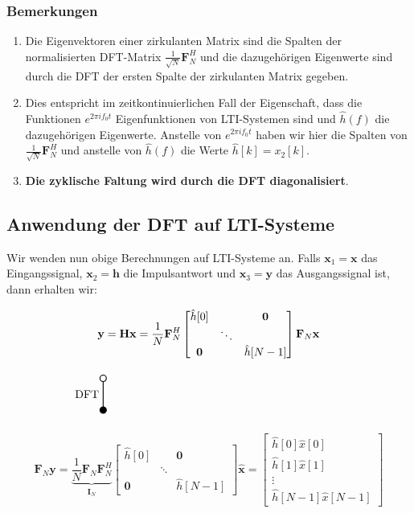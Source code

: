 \documentclass[11pt]{article}
\newcommand{\verticaltransform}[4]{%
    \begin{tikzpicture}
        \filldraw[thick] (0,0) circle (0.1) node[below=3pt] {$#4$};
        \draw[thick] (0,0.1) -- (0,#2 -0.1) node[midway, left] {#1};
        \draw[thick] (0,#2) circle (0.1) node[above=3pt] {$#3$};
    \end{tikzpicture}%
}
\begin{document}
\subsubsection*{Bemerkungen}

\begin{enumerate}
    \item Die Eigenvektoren einer zirkulanten Matrix sind die Spalten der normalisierten DFT-Matrix $\frac{1}{\sqrt{N}}\mathbf{F}_N^H$ und die dazugehörigen Eigenwerte sind durch die DFT der ersten Spalte der zirkulanten Matrix gegeben. 
    \item Dies entspricht im zeitkontinuierlichen Fall der Eigenschaft, dass die
    Funktionen $e^{2 \pi i f_0 t}$ Eigenfunktionen von LTI-Systemen sind und $\hat{h}(f)$ die dazugehörigen Eigenwerte. Anstelle von $e^{2 \pi i f_0 t}$ haben wir hier die Spalten von $\frac{1}{\sqrt{N}}\mathbf{F}_N^H$ und anstelle von $\hat{h}(f)$ die Werte $\hat{h}[k] = x_2[k]$.
    \item \textbf{Die zyklische Faltung wird durch die DFT diagonalisiert}.
\end{enumerate}


\subsection*{Anwendung der DFT auf LTI-Systeme}
\vspace*{-0.5cm}

Wir wenden nun obige Berechnungen auf LTI-Systeme an. Falls $\mathbf{x}_1 = \mathbf{x}$ das Eingangssignal, $\mathbf{x}_2 = \mathbf{h}$ die Impulsantwort und $\mathbf{x}_3 = \mathbf{y}$ das Ausgangssignal ist, dann erhalten wir:

\pagebreak

$$\vspace*{-0.75cm}\mathbf{y} = \mathbf{H}\mathbf{x} =  \frac{1}{N} \mathbf{F}_N^H  \begin{bmatrix}
    \hat{h}[0] & & \mathbf{0} \\
    & \ddots & \\
    \mathbf{0} & & \hat{h}[N-1]
\end{bmatrix} \mathbf{F}_N \mathbf{x}$$
$$\vspace*{-1cm}\verticaltransform{\text{DFT}}{1}{}{} \hspace{7.5cm}$$
$$\mathbf{F}_N \mathbf{y} = \underbrace{\frac{1}{N} \mathbf{F}_N \mathbf{F}_N^H}_{\mathbf{I}_N}  \begin{bmatrix}
    \hat{h}[0] & & \mathbf{0} \\
    & \ddots & \\
    \mathbf{0} & & \hat{h}[N-1]
\end{bmatrix} \hat{\mathbf{x}} = \begin{bmatrix}
    \hat{h}[0] \hat{x}[0] \\
    \hat{h}[1] \hat{x}[1] \\
    \vdots \\
    \hat{h}[N-1] \hat{x}[N-1]
\end{bmatrix}$$
\end{document}
